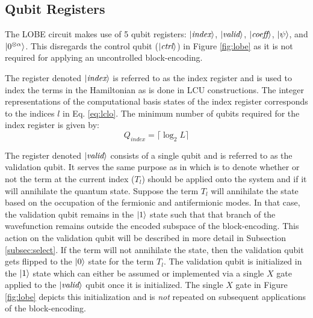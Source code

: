 \subsection{Qubit Registers}
\label{subsec:registers}

The LOBE circuit makes use of 5 qubit registers: $\ket{\textit{index}}$, $\ket{\textit{valid}}$, $\ket{\textit{coeff}}$, $\ket{\psi}$, and $\ket{0^{\otimes \alpha}}$.
This disregards the control qubit ($\ket{\textit{ctrl}}$) in Figure \ref{fig:lobe} as it is not required for applying an uncontrolled block-encoding.

The register denoted $\ket{\textit{index}}$ is referred to as the index register and is used to index the terms in the Hamiltonian as is done in LCU constructions. 
The integer representations of the computational basis states of the index register corresponds to the indices $l$ in Eq. \ref{eq:lclo}. 
The minimum number of qubits required for the index register is given by:
\begin{equation}
    Q_{\textit{index}} = \lceil \log_2{L} \rceil
\end{equation}

The register denoted $\ket{\textit{valid}}$ consists of a single qubit and is referred to as the validation qubit.
It serves the same purpose as in \cite{liu2024efficient} which is to denote whether or not the term at the current index ($T_l$) should be applied onto the system and if it will annihilate the quantum state.
Suppose the term $T_l$ will annihilate the state based on the occupation of the fermionic and antifermionic modes. 
In that case, the validation qubit remains in the $\ket{1}$ state such that that branch of the wavefunction remains outside the encoded subspace of the block-encoding.
This action on the validation qubit will be described in more detail in Subsection \ref{subsec:select}.
If the term will not annihilate the state, then the validation qubit gets flipped to the $\ket{0}$ state for the term $T_l$.
The validation qubit is initialized in the $\ket{1}$ state which can either be assumed or implemented via a single $X$ gate applied to the $\ket{\textit{valid}}$ qubit once it is initialized.
The single $X$ gate in Figure \ref{fig:lobe} depicts this initialization and is \textit{not} repeated on subsequent applications of the block-encoding.

